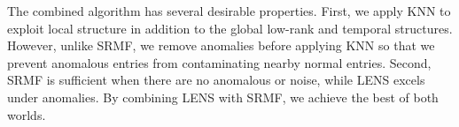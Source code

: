 {%

The combined algorithm has several desirable properties. First, we
apply KNN to exploit local structure in addition to the global
low-rank and temporal structures. However, unlike SRMF, we remove
anomalies before applying KNN so that we prevent anomalous entries
from contaminating nearby normal entries. Second, SRMF is sufficient
when there are no anomalous or noise, while LENS excels under
anomalies. By combining LENS with SRMF, we achieve the best of both
worlds. 

% 
}
